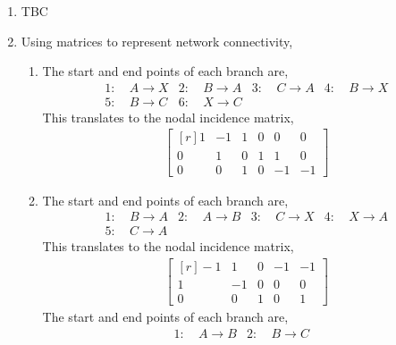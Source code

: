 \begin{enumerate}
    \item TBC

    \item Using matrices to represent network connectivity,
          \begin{enumerate}
              \item The start and end points of each branch are,
                    \begin{align}
                        1 :\  & A \to X & 2 :\  & B \to A &
                        3 :\  & C \to A & 4 :\  & B \to X   \\
                        5 :\  & B \to C & 6 :\  & X \to C &
                    \end{align}
                    This translates to the nodal incidence matrix,
                    \begin{align}
                        \begin{bmatrix*}[r]
                            1 & -1 & 1 & 0 & 0  & 0  \\
                            0 & 1  & 0 & 1 & 1  & 0  \\
                            0 & 0  & 1 & 0 & -1 & -1
                        \end{bmatrix*}
                    \end{align}
              \item The start and end points of each branch are,
                    \begin{align}
                        1 :\  & B \to A & 2 :\  & A \to B &
                        3 :\  & C \to X & 4 :\  & X \to A   \\
                        5 :\  & C \to A
                    \end{align}
                    This translates to the nodal incidence matrix,
                    \begin{align}
                        \begin{bmatrix*}[r]
                            -1 & 1  & 0 & -1 & -1 \\
                            1  & -1 & 0 & 0  & 0  \\
                            0  & 0  & 1 & 0  & 1
                        \end{bmatrix*}
                    \end{align}
                    The start and end points of each branch are,
                    \begin{align}
                        1 :\  & A \to B & 2 :\  & B \to C &

\end{align}
\end{enumerate}
\end{enumerate}
